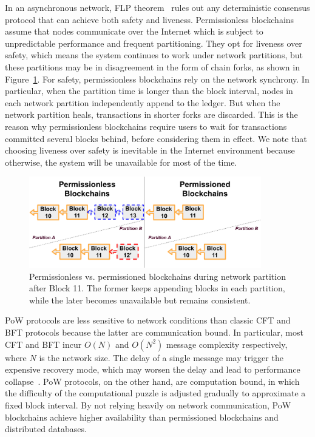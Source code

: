 In an asynchronous network, FLP theorem~\cite{fischer1982impossibility} rules out any deterministic
consensus protocol that can achieve both safety and liveness. Permissionless blockchains assume that nodes communicate
over the Internet which is subject to unpredictable performance and frequent partitioning. They opt for
liveness over safety, which means the system continues to work under network partitions, but these partitions may be in disagreement in the form of
chain forks, as shown in Figure~\ref{diagram:twin:fork}. For safety, permissionless blockchains rely on the network synchrony. In particular, when the partition time is longer than the block interval, nodes in each network partition independently append to the ledger. But when the network partition heals, transactions in shorter forks are discarded. This is the reason why permissionless blockchains require users to wait for transactions committed several blocks behind, before considering them in effect. We note that choosing liveness over safety is inevitable in the Internet environment because otherwise, the system will be unavailable for most of the time. 

\begin{figure}
    \centering
    \includegraphics[width=0.9\textwidth]{diagram/twin/fork.pdf}
    \caption{Permissionless vs. permissioned blockchains during network partition after Block 11. The former keeps appending
    blocks in each partition, while the later becomes unavailable but remains consistent.} 
    \label{diagram:twin:fork} 
\end{figure}

PoW protocols are less sensitive to network conditions than classic CFT and BFT protocols because the latter are communication bound. In particular, most CFT and BFT incur $O(N)$ and $O(N^2)$ message complexity respectively, where $N$ is the network size. The delay of a single message may trigger the expensive recovery mode, which may worsen the delay and lead to performance collapse~\cite{dinh2017blockbench}. PoW protocols, on the other hand, are computation bound, in which the difficulty of the computational puzzle is adjusted gradually to approximate a fixed block interval. %
By not relying heavily on network communication, PoW blockchains achieve higher availability than permissioned blockchains and distributed databases.

